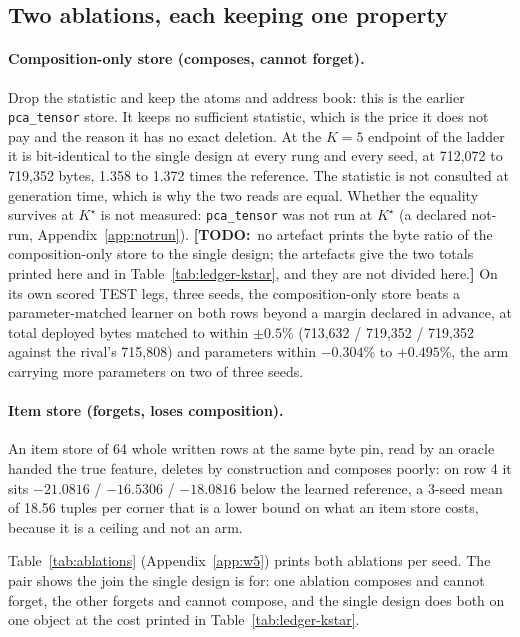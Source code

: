 \documentclass{article} %
\newcommand{\TODO}[1]{{\color{orange}\textbf{[TODO:}~#1\textbf{]}}}
\newcommand{\Kstar}{\ensuremath{K^{\star}}}
\begin{document}
\subsection{Two ablations, each keeping one property}
\label{sec:ablations}

\paragraph{Composition-only store (composes, cannot forget).} Drop the statistic and keep the
atoms and address book: this is the earlier \texttt{pca\_tensor} store. It keeps no sufficient
statistic, which is the price it does not pay and the reason it has no exact deletion. At the
$K=5$ endpoint of the ladder it is bit-identical to the single design at every rung and every
seed, at 712,072 to 719,352 bytes, 1.358 to 1.372 times the reference.
The statistic is not consulted at generation time, which is why the two reads are equal.
Whether the equality survives at $\Kstar$ is not measured: \texttt{pca\_tensor} was not run at
$\Kstar$ (a declared not-run, Appendix~\ref{app:notrun}). \TODO{no artefact prints the byte ratio of the composition-only store to the single design;
the artefacts give the two totals printed here and in Table~\ref{tab:ledger-kstar}, and they are
not divided here.}
On its own scored TEST legs, three seeds, the composition-only store beats a parameter-matched
learner on both rows beyond a margin declared in advance, at total deployed bytes matched to
within $\pm0.5$\% (713,632 / 719,352 / 719,352 against the rival's 715,808) and parameters within
$-0.304$\% to $+0.495$\%, the arm carrying more parameters on two of three seeds.

\paragraph{Item store (forgets, loses composition).} An item store of 64 whole written rows at
the same byte pin, read by an oracle handed the true feature, deletes by construction and
composes poorly: on row 4 it sits $-21.0816$ / $-16.5306$ / $-18.0816$ below the learned
reference, a 3-seed mean of 18.56 tuples per corner that is a lower bound on what an item store
costs, because it is a ceiling and not an arm. %

Table~\ref{tab:ablations} (Appendix~\ref{app:w5}) prints both ablations per seed. The pair shows
the join the single design is for: one ablation composes and cannot
forget, the other forgets and cannot compose, and the single design does both on one object at
the cost printed in Table~\ref{tab:ledger-kstar}.
\end{document}
